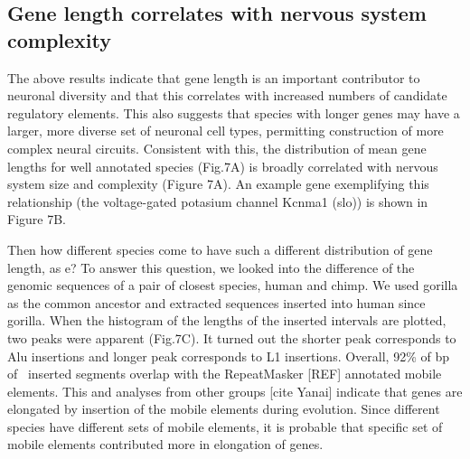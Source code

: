 \subsection{Gene length correlates with nervous system complexity}

The above results indicate that gene length is an important contributor to neuronal diversity and that this correlates with  increased numbers of candidate regulatory elements. This also suggests that species with longer genes may have a larger, more diverse set of neuronal cell types, permitting construction of more complex neural circuits. Consistent with this, the distribution of mean gene lengths for well annotated species (Fig.7A) is broadly correlated with nervous system size and complexity (Figure 7A). An example gene exemplifying this relationship (the voltage-gated potasium channel Kcnma1 (slo)) is shown in Figure 7B. 

Then how different species come to have such a different distribution of gene length, as e? To answer this question, we looked into the difference of the genomic sequences of a pair of closest species, human and chimp. We used gorilla as the common ancestor and extracted sequences inserted into human since gorilla. When the histogram of the lengths of the inserted intervals are plotted, two peaks were apparent (Fig.7C). It turned out the shorter peak corresponds to Alu insertions and longer peak corresponds to L1 insertions. Overall, 92\% of bp of \ inserted segments overlap with the RepeatMasker [REF] annotated mobile elements. This and analyses from other groups [cite Yanai] indicate that genes are elongated by insertion of the mobile elements during evolution. Since different species have different sets of mobile elements, it is probable that specific set of mobile elements contributed more in elongation of genes.
